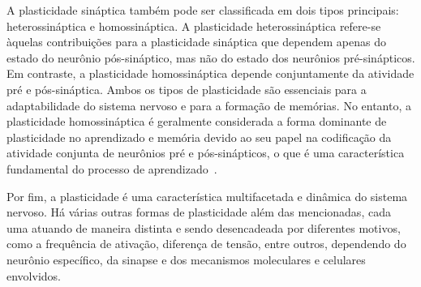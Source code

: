 A plasticidade sináptica também pode ser classificada em dois tipos principais: heterossináptica e homossináptica. A plasticidade
heterossináptica refere-se àquelas contribuições para a plasticidade sináptica que dependem apenas do estado do neurônio
pós-sináptico, mas não do estado dos neurônios pré-sinápticos. Em contraste, a plasticidade homossináptica depende conjuntamente
da atividade pré e pós-sináptica. Ambos os tipos de plasticidade são essenciais para a adaptabilidade do sistema nervoso e para a
formação de memórias. No entanto, a plasticidade homossináptica é geralmente considerada a forma dominante de plasticidade no
aprendizado e memória devido ao seu papel na codificação da atividade conjunta de neurônios pré e pós-sinápticos, o que é uma
característica fundamental do processo de aprendizado~\cite{grangerExpression2014, feldmanSynaptic2009}.

Por fim, a plasticidade é uma característica multifacetada e dinâmica do sistema nervoso. Há várias outras formas de plasticidade
além das mencionadas, cada uma atuando de maneira distinta e sendo desencadeada por diferentes motivos, como a frequência de
ativação, diferença de tensão, entre outros, dependendo do neurônio específico, da sinapse e dos mecanismos moleculares e celulares
envolvidos.

